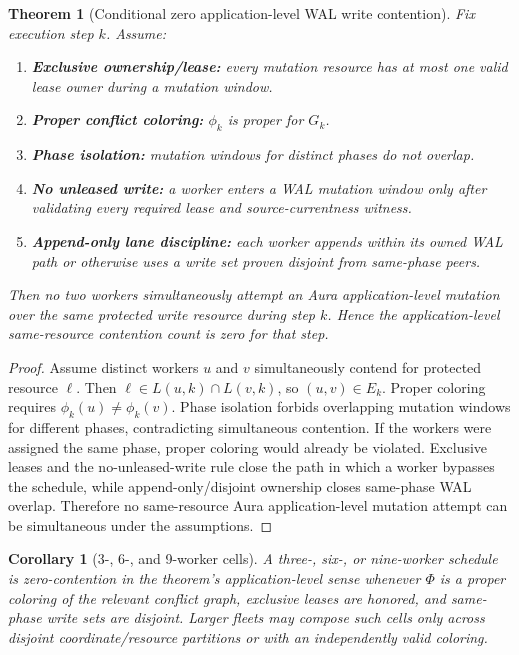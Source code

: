 \documentclass[11pt]{article}
\newtheorem{theorem}{Theorem}
\newtheorem{corollary}{Corollary}
\begin{document}
\begin{theorem}[Conditional zero application-level WAL write contention]
Fix execution step \(k\). Assume:
\begin{enumerate}[label=(A\arabic*)]
\item \textbf{Exclusive ownership/lease:} every mutation resource has at most one valid lease owner during a mutation window.
\item \textbf{Proper conflict coloring:} \(\phi_k\) is proper for \(G_k\).
\item \textbf{Phase isolation:} mutation windows for distinct phases do not overlap.
\item \textbf{No unleased write:} a worker enters a WAL mutation window only after validating every required lease and source-currentness witness.
\item \textbf{Append-only lane discipline:} each worker appends within its owned WAL path or otherwise uses a write set proven disjoint from same-phase peers.
\end{enumerate}
Then no two workers simultaneously attempt an Aura application-level mutation over the same protected write resource during step \(k\). Hence the application-level same-resource contention count is zero for that step.
\end{theorem}

\begin{proof}
Assume distinct workers \(u\) and \(v\) simultaneously contend for protected resource \(\ell\). Then \(\ell\in L(u,k)\cap L(v,k)\), so \((u,v)\in E_k\). Proper coloring requires \(\phi_k(u)\neq\phi_k(v)\). Phase isolation forbids overlapping mutation windows for different phases, contradicting simultaneous contention. If the workers were assigned the same phase, proper coloring would already be violated. Exclusive leases and the no-unleased-write rule close the path in which a worker bypasses the schedule, while append-only/disjoint ownership closes same-phase WAL overlap. Therefore no same-resource Aura application-level mutation attempt can be simultaneous under the assumptions.
\end{proof}

\begin{corollary}[3-, 6-, and 9-worker cells]
A three-, six-, or nine-worker schedule is zero-contention in the theorem's application-level sense whenever \(\Phi\) is a proper coloring of the relevant conflict graph, exclusive leases are honored, and same-phase write sets are disjoint. Larger fleets may compose such cells only across disjoint coordinate/resource partitions or with an independently valid coloring.
\end{corollary}
\end{document}
